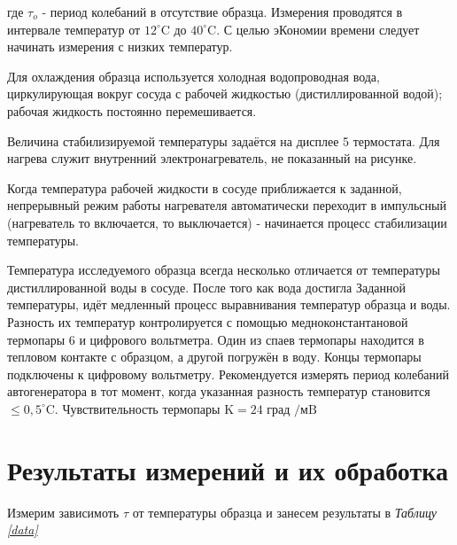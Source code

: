 \documentclass[12pt]{article}
\begin{document}
где $\tau_{o}$ - период колебаний в отсутствие образца. Измерения проводятся в интервале температур от $12^{\circ} \mathrm{C}$ до $40^{\circ} \mathrm{C} .$ С целью
эКономии времени следует начинать измерения с низких температур.

Для охлаждения образца используется холодная водопроводная вода, циркулирующая вокруг сосуда с рабочей жидкостью (дистиллированной водой); рабочая жидкость постоянно перемешивается.

Величина стабилизируемой температуры задаётся на дисплее 5 термостата. Для нагрева служит внутренний электронагреватель, не показанный на
рисунке.

Когда температура рабочей жидкости в сосуде приближается к заданной, непрерывный режим работы нагревателя автоматически переходит в импульсный (нагреватель то включается, то выключается) - начинается процесс стабилизации температуры.

Температура исследуемого образца всегда несколько отличается от температуры дистиллированной воды в сосуде. После того как вода достигла
Заданной температуры, идёт медленный процесс выравнивания температур
образца и воды. Разность их температур контролируется с помощью медноконстантановой термопары 6 и цифрового вольтметра. Один из спаев термопары находится в тепловом контакте с образцом, а другой погружён в воду. Концы термопары подключены к цифровому вольтметру. Рекомендуется измерять период колебаний автогенератора в тот момент, когда указанная разность температур становится $\leqslant 0,5^{\circ} \mathrm{C} .$ Чувствительность термопары $\mathrm{K}=24$ град $/ \mathrm{мB}$


\section{Результаты измерений и их обработка}

Измерим зависимоть $\tau$ от температуры образца и занесем результаты в \textit{Таблицу \ref{data}}
\end{document}
